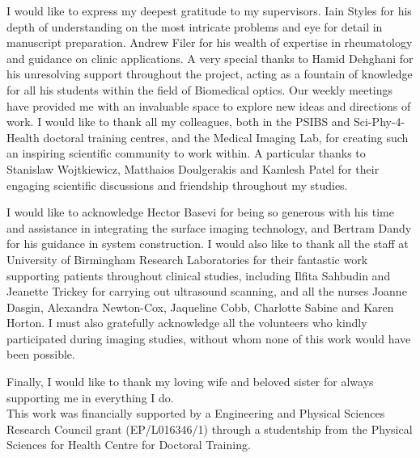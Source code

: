 \documentclass[twoside]{bhamthesis}
\theoremstyle{definition}
\begin{document}
\begin{acknowledgements}

I would like to express my deepest gratitude to my supervisors. Iain Styles for his depth of understanding on the most intricate problems and eye for detail in manuscript preparation. Andrew Filer for his wealth of expertise in rheumatology and guidance on clinic applications. A very special thanks to Hamid Dehghani for his unresolving support throughout the project, acting as a fountain of knowledge for all his students within the field of Biomedical optics. Our weekly meetings have provided me with an invaluable space to explore new ideas and directions of work. I would like to thank all my colleagues, both in the PSIBS and Sci-Phy-4-Health doctoral training centres, and the Medical Imaging Lab, for creating such an inspiring scientific community to work within. A particular thanks to Stanislaw Wojtkiewicz, Matthaios Doulgerakis and Kamlesh Patel for their engaging scientific discussions and friendship throughout my studies. 

I would like to acknowledge Hector Basevi for being so generous with his time and assistance in integrating the surface imaging technology, and Bertram Dandy for his guidance in system construction. I would also like to thank all the staff at University of Birmingham Research Laboratories for their fantastic work supporting patients throughout clinical studies, including Ilfita Sahbudin and Jeanette Trickey for carrying out ultrasound scanning, and all the nurses Joanne Dasgin, Alexandra Newton-Cox, Jaqueline Cobb, Charlotte Sabine and Karen Horton. I must also gratefully acknowledge all the volunteers who kindly participated during imaging studies, without whom none of this work would have been possible. 

Finally, I would like to thank my loving wife and beloved sister for always supporting me in everything I do.
\\[2cm]
This work was financially supported by a Engineering and Physical Sciences Research Council grant (EP/L016346/1) through a studentship from the Physical Sciences for Health Centre for Doctoral Training.
\end{acknowledgements}
\end{document}
